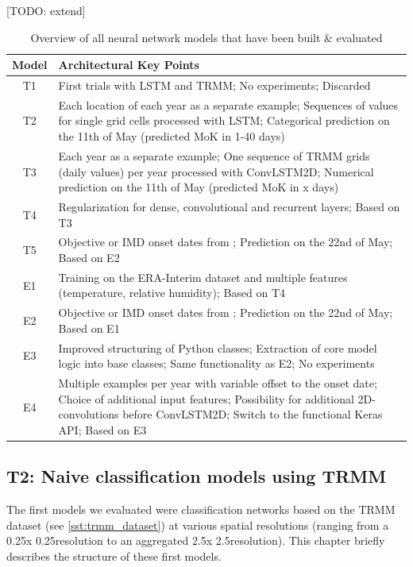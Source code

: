 [TODO: extend]

\begin{table}[h]
  \begin{tabularx}{\linewidth}{|c|X|}
    \hline
    Model & Architectural Key Points \\
    \hline
    T1 & First trials with LSTM and TRMM; No experiments; Discarded \\
    T2 & Each location of each year as a separate example; Sequences of values for single grid cells processed with LSTM; Categorical prediction on the 11th of May (predicted MoK in 1-40 days) \\
    T3 & Each year as a separate example; One sequence of TRMM grids (daily values) per year processed with ConvLSTM2D; Numerical prediction on the 11th of May (predicted MoK in x days) \\
    T4 & Regularization for dense, convolutional and recurrent layers; Based on T3 \\
    T5 & Objective or IMD onset dates from \citep{Singh.2009}; Prediction on the 22nd of May; Based on E2 \\
    \hline
    E1 & Training on the ERA-Interim dataset and multiple features (temperature, relative humidity); Based on T4 \\
    E2 & Objective or IMD onset dates from \citep{Singh.2009}; Prediction on the 22nd of May; Based on E1 \\
    E3 & Improved structuring of Python classes; Extraction of core model logic into base classes; Same functionality as E2; No experiments \\
    E4 & Multiple examples per year with variable offset to the onset date; Choice of additional input features; Possibility for additional 2D-convolutions before ConvLSTM2D; Switch to the functional Keras API; Based on E3 \\
    \hline
  \end{tabularx}
  \caption{Overview of all neural network models that have been built \& evaluated}
  \label{tab:nn_overall_summary}
\end{table}



\newpage
\subsection{T2: Naive classification models using TRMM}
\label{sst:nn_t2}
The first models we evaluated were classification networks based on the TRMM dataset (see \cref{sst:trmm_dataset}) at various spatial resolutions (ranging from a 0.25\degree x 0.25\degree resolution to an aggregated 2.5\degree x 2.5\degree resolution). This chapter briefly describes the structure of these first models.

